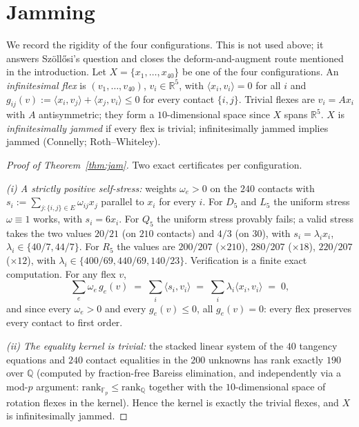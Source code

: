 \documentclass[11pt]{article}
\theoremstyle{remark}
\newcommand{\R}{\mathbb{R}}
\newcommand{\Q}{\mathbb{Q}}
\newcommand{\ip}[2]{\langle #1,#2\rangle}
\begin{document}
\section{Jamming}\label{sec:jam}

We record the rigidity of the four configurations. This is not used
above; it answers Sz\"oll\H{o}si's question and closes the
deform-and-augment route mentioned in the introduction.
Let $X=\{x_1,\dots,x_{40}\}$ be one of the four configurations. An
\emph{infinitesimal flex} is $(v_1,\dots,v_{40})$, $v_i\in\R^5$, with
$\ip{x_i}{v_i}=0$ for all $i$ and
$g_{ij}(v):=\ip{x_i}{v_j}+\ip{x_j}{v_i}\le 0$ for every contact
$\{i,j\}$. Trivial flexes are $v_i=Ax_i$ with $A$ antisymmetric; they
form a $10$-dimensional space since $X$ spans $\R^5$. $X$ is
\emph{infinitesimally jammed} if every flex is trivial; infinitesimally
jammed implies jammed \cite[Thm.~2.2]{CJKT2011} (Connelly;
Roth--Whiteley).

\begin{proof}[Proof of Theorem~\ref{thm:jam}]
Two exact certificates per configuration.

\emph{(i) A strictly positive self-stress:} weights $\omega_e>0$ on the
$240$ contacts with $s_i:=\sum_{j:\{i,j\}\in E}\omega_{ij}x_j$ parallel
to $x_i$ for every $i$. For $D_5$ and $L_5$ the uniform stress
$\omega\equiv 1$ works, with $s_i=6x_i$. For $Q_5$ the uniform stress
provably fails; a valid stress takes the two values $20/21$ (on $210$
contacts) and $4/3$ (on $30$), with $s_i=\lambda_i x_i$,
$\lambda_i\in\{40/7,44/7\}$. For $R_5$ the values are $200/207$
($\times 210$), $280/207$ ($\times 18$), $220/207$ ($\times 12$), with
$\lambda_i\in\{400/69,440/69,140/23\}$. Verification is a finite exact
computation. For any flex $v$,
\[
\textstyle\sum_e \omega_e\, g_e(v) \;=\; \sum_i \ip{s_i}{v_i}
\;=\; \sum_i \lambda_i \ip{x_i}{v_i} \;=\; 0 ,
\]
and since every $\omega_e>0$ and every $g_e(v)\le 0$, all $g_e(v)=0$:
every flex preserves every contact to first order.

\emph{(ii) The equality kernel is trivial:} the stacked linear system of
the $40$ tangency equations and $240$ contact equalities in the $200$
unknowns has rank exactly $190$ over $\Q$ (computed by fraction-free
Bareiss elimination, and independently via a mod-$p$ argument:
$\mathrm{rank}_{\mathbb F_p}\le\mathrm{rank}_\Q$ together with the
$10$-dimensional space of rotation flexes in the kernel). Hence the
kernel is exactly the trivial flexes, and $X$ is infinitesimally
jammed.
\end{proof}
\end{document}
